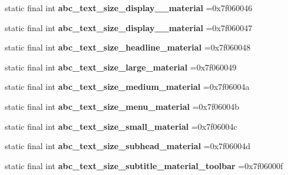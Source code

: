 \begin{DoxyCompactItemize}
static final int {\bfseries abc\+\_\+text\+\_\+size\+\_\+display\+\_\+\_\+material} =0x7f060046
\item 
\mbox{\label{classproject4_1_1xaria_1_1R_1_1dimen_af66ae32205e8250c31e9988be1e88e14}} 
static final int {\bfseries abc\+\_\+text\+\_\+size\+\_\+display\+\_\+\_\+material} =0x7f060047
\item 
\mbox{\label{classproject4_1_1xaria_1_1R_1_1dimen_a36a49770e1b4dc4bdb2015d4aa6447d7}} 
static final int {\bfseries abc\+\_\+text\+\_\+size\+\_\+headline\+\_\+material} =0x7f060048
\item 
\mbox{\label{classproject4_1_1xaria_1_1R_1_1dimen_a45b492b27b72da49ecb7193932fa3611}} 
static final int {\bfseries abc\+\_\+text\+\_\+size\+\_\+large\+\_\+material} =0x7f060049
\item 
\mbox{\label{classproject4_1_1xaria_1_1R_1_1dimen_a7ca5b48f366715bf25ea8e44b67ec052}} 
static final int {\bfseries abc\+\_\+text\+\_\+size\+\_\+medium\+\_\+material} =0x7f06004a
\item 
\mbox{\label{classproject4_1_1xaria_1_1R_1_1dimen_a27e5d77e1672adff6de99d72bcb4ecb3}} 
static final int {\bfseries abc\+\_\+text\+\_\+size\+\_\+menu\+\_\+material} =0x7f06004b
\item 
\mbox{\label{classproject4_1_1xaria_1_1R_1_1dimen_a7b643e79a7038d6256d999adb2a94946}} 
static final int {\bfseries abc\+\_\+text\+\_\+size\+\_\+small\+\_\+material} =0x7f06004c
\item 
\mbox{\label{classproject4_1_1xaria_1_1R_1_1dimen_ae7d6ffa885635a49306c740b9bb6653a}} 
static final int {\bfseries abc\+\_\+text\+\_\+size\+\_\+subhead\+\_\+material} =0x7f06004d
\item 
\mbox{\label{classproject4_1_1xaria_1_1R_1_1dimen_adb53fe7d8aa1c3bc4a2062a446f17455}} 
static final int {\bfseries abc\+\_\+text\+\_\+size\+\_\+subtitle\+\_\+material\+\_\+toolbar} =0x7f06000f
\item 

\end{DoxyCompactItemize}
